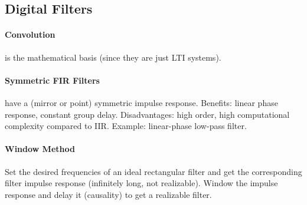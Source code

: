 \documentclass{article}
\begin{document}
\begin{multicols}{2}
    \section*{Digital Filters}

    \paragraph{Convolution} is the mathematical basis (since they are just LTI systems).

    \paragraph{Symmetric FIR Filters} have a (mirror or point) symmetric impulse response. Benefits: linear phase response, constant group delay. Disadvantages: high order, high computational complexity compared to IIR. Example: linear-phase low-pass filter.

    \paragraph{Window Method} Set the desired frequencies of an ideal rectangular filter and get the corresponding filter impulse response (infinitely long, not realizable). Window the impulse response and delay it (causality) to get a realizable filter.
\end{multicols}
\end{document}
